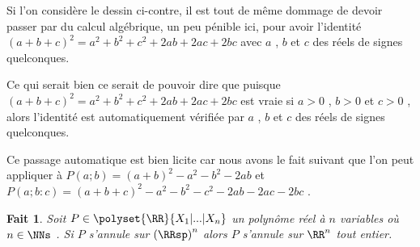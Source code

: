 \documentclass[12pt]{amsart}
\newtheorem*{fact*}{Fait}
\begin{document}
\medskip

Si l'on considère le dessin ci-contre, il est tout de même dommage de devoir passer par du calcul algébrique, un peu pénible ici, pour avoir l'identité $(a + b + c)^2 = a^2 + b^2 + c^2 + 2 ab + 2 ac + 2 bc$ avec $a$ , $b$ et $c$ des réels de signes quelconques.


\medskip

Ce qui serait bien ce serait de pouvoir dire que puisque $(a + b + c)^2 = a^2 + b^2 + c^2 + 2 ab + 2 ac + 2 bc$ est vraie si $a > 0$ , $b > 0$ et $c > 0$ , alors l'identité est automatiquement vérifiée par $a$ , $b$ et $c$ des réels de signes quelconques.




\medskip

Ce passage automatique est bien licite car nous avons le fait suivant que l'on peut appliquer à $P(a ; b) = (a + b)^2 - a^2 - b^2 - 2 ab$ et $P(a ; b : c) = (a + b + c)^2 - a^2 - b^2 - c^2 - 2 ab - 2 ac - 2 bc$ .

\begin{fact*}
	Soit $P \in \polyset{\RR}{X_1 | ... | X_n}$ un polynôme réel à $n$ variables où $n \in \NNs$ .
	Si $P$ s'annule sur $\left( \RRsp \right)^n$ alors $P$ s'annule sur $\RR^n$ tout entier. 
\end{fact*}
\end{document}
